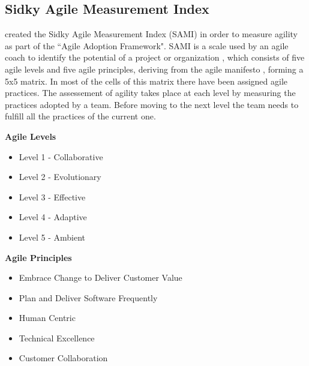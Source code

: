 %

\subsection{Sidky Agile Measurement Index} %
\citet{sidky_dissertation} created the Sidky Agile Measurement Index (SAMI) in order to measure agility as part of the ``Agile Adoption Framework". SAMI is a scale used by an agile coach to identify the potential of a project or organization \cite{sidky}, which consists of five agile levels and five agile principles, deriving from the agile manifesto \cite{beck2001agile}, forming a 5x5 matrix. In most of the cells of this matrix there have been assigned agile practices. The assessement of agility takes place at each level by measuring the practices adopted by a team. Before moving to the next level the team needs to fulfill all the practices of the current one.

\begin{minipage}[t]{0.35\linewidth}
    \textbf{Agile Levels}
    \begin{itemize}
    \item{Level 1 - Collaborative}
    \item{Level 2 - Evolutionary}
    \item{Level 3 - Effective}
    \item{Level 4 - Adaptive}
    \item{Level 5 - Ambient}
    \end{itemize}
    \end{minipage}
    \begin{minipage}[t]{0.6\linewidth}
    \textbf{Agile Principles}
    \begin{itemize}
    \item{Embrace Change to Deliver Customer Value}
    \item{Plan and Deliver Software Frequently}
    \item{Human Centric}
    \item{Technical Excellence}
    \item{Customer Collaboration}
    \end{itemize}
\end{minipage}

